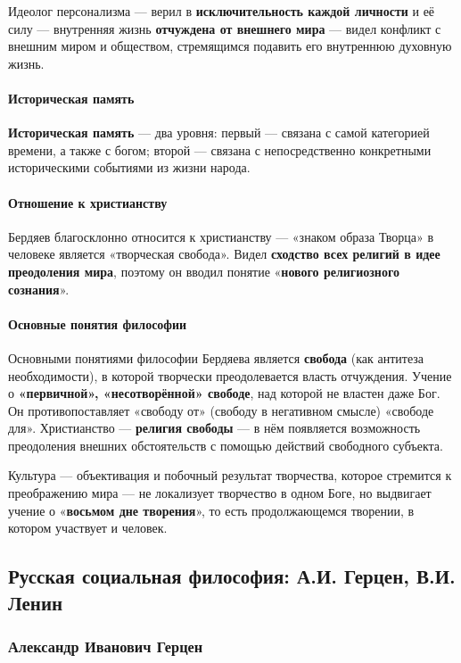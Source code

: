\documentclass{article}
\begin{document}
\begin{flushleft}
Идеолог персонализма — верил в \textbf{исключительность каждой личности} и её силу — внутренняя жизнь \textbf{отчуждена от внешнего мира} — видел конфликт с внешним миром и обществом, стремящимся подавить его внутреннюю духовную жизнь.

\paragraph{Историческая память}

\textbf{Историческая память}  — два уровня: первый — связана с самой категорией времени, а также с богом; второй — связана с непосредственно конкретными историческими событиями из жизни народа.

\paragraph{Отношение к христианству}

Бердяев благосклонно относится к христианству — «знаком образа Творца» в человеке является «творческая свобода». Видел \textbf{сходство всех религий в идее преодоления мира}, поэтому он вводил понятие «\textbf{нового религиозного сознания}».


\paragraph{Основные понятия философии}

Основными понятиями философии Бердяева является \textbf{свобода} (как антитеза необходимости), в которой творчески преодолевается власть отчуждения. Учение о \textbf{«первичной», «несотворённой» свободе}, над которой не властен даже Бог. Он противопоставляет «свободу от» (свободу в негативном смысле) «свободе для». Христианство — \textbf{религия свободы} — в нём появляется возможность преодоления внешних обстоятельств с помощью действий свободного субъекта.

Культура — объективация и побочный результат творчества, которое стремится к преображению мира — не локализует творчество в одном Боге, но выдвигает учение о «\textbf{восьмом дне творения}», то есть продолжающемся творении, в котором участвует и человек.

\subsection{Русская социальная философия: А.И. Герцен, В.И. Ленин}

\subsubsection{Александр Иванович Герцен}


\end{flushleft}
\end{document}
